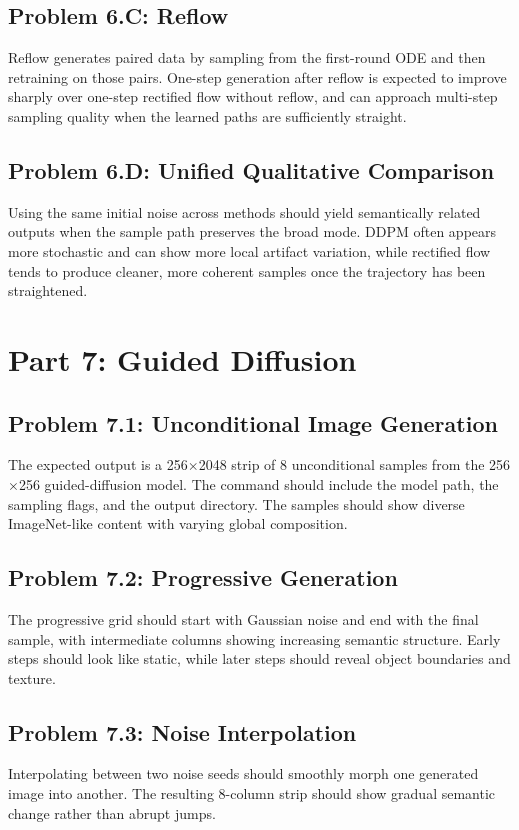 \documentclass[11pt]{article}
\begin{document}
\subsection*{Problem 6.C: Reflow}
Reflow generates paired data by sampling from the first-round ODE and then retraining on those pairs. One-step generation after reflow is expected to improve sharply over one-step rectified flow without reflow, and can approach multi-step sampling quality when the learned paths are sufficiently straight.

\subsection*{Problem 6.D: Unified Qualitative Comparison}
Using the same initial noise across methods should yield semantically related outputs when the sample path preserves the broad mode. DDPM often appears more stochastic and can show more local artifact variation, while rectified flow tends to produce cleaner, more coherent samples once the trajectory has been straightened.

\section{Part 7: Guided Diffusion}
\subsection*{Problem 7.1: Unconditional Image Generation}
The expected output is a 256$\times$2048 strip of 8 unconditional samples from the 256$\times$256 guided-diffusion model. The command should include the model path, the sampling flags, and the output directory. The samples should show diverse ImageNet-like content with varying global composition.

\subsection*{Problem 7.2: Progressive Generation}
The progressive grid should start with Gaussian noise and end with the final sample, with intermediate columns showing increasing semantic structure. Early steps should look like static, while later steps should reveal object boundaries and texture.

\subsection*{Problem 7.3: Noise Interpolation}
Interpolating between two noise seeds should smoothly morph one generated image into another. The resulting 8-column strip should show gradual semantic change rather than abrupt jumps.
\end{document}
